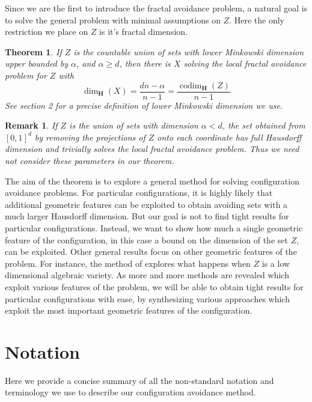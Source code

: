 \documentclass{article}
\theoremstyle{plain}
\theoremstyle{plain}
\newtheorem{theorem}{Theorem}
\newtheorem*{remark}{Remark}
\DeclareMathOperator{\codim}{codim}
\begin{document}
Since we are the first to introduce the fractal avoidance problem, a natural goal is to solve the general problem with minimal assumptions on $Z$. Here the only restriction we place on $Z$ is it's fractal dimension.

\begin{theorem}
	If $Z$ is the countable union of sets with lower Minkowski dimension upper bounded by $\alpha$, and $\alpha \geq d$, then there is $X$ solving the local fractal avoidance problem for $Z$ with
	\[ \dim_{\mathbf{H}}(X) = \frac{dn - \alpha}{n - 1} = \frac{\codim_{\mathbf{H}}(Z)}{n - 1} \]
	See section 2 for a precise definition of lower Minkowski dimension we use. %
\end{theorem}

\begin{remark}
	If $Z$ is the union of sets with dimension $\alpha < d$, the set obtained from $[0,1]^d$ by removing the projections of $Z$ onto each coordinate has full Hausdorff dimension and trivially solves the local fractal avoidance problem. Thus we need not consider these parameters in our theorem.
\end{remark}

The aim of the theorem is to explore a general method for solving configuration avoidance problems. For particular configurations, it is highly likely that additional geometric features can be exploited to obtain avoiding sets with a much larger Hausdorff dimension. But our goal is not to find tight results for particular configurations. Instead, we want to show how much a single geometric feature of the configuration, in this case a bound on the dimension of the set $Z$, can be exploited. Other general results focus on other geometric features of the problem. For instance, the method of \cite{Mathe} explores what happens when $Z$ is a low dimensional algebraic variety. As more and more methods are revealed which exploit various features of the problem, we will be able to obtain tight results for particular configurations with ease, by synthesizing various approaches which exploit the most important geometric features of the configuration.

\section{Notation}

Here we provide a concise summary of all the non-standard notation and terminology we use to describe our configuration avoidance method.
\end{document}
